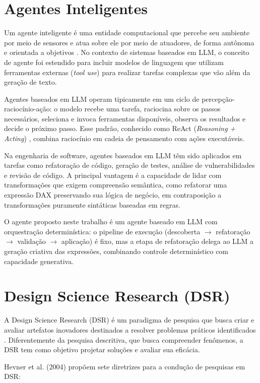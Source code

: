 \documentclass[
    12pt,               %
    openright,          %
    oneside,            %
    a4paper,            %
    chapter=TITLE,      %
    section=TITLE,      %
    brazil              %
]{abntex2}
\begin{document}
\section{Agentes Inteligentes}

Um agente inteligente é uma entidade computacional que percebe seu ambiente por meio de sensores e atua sobre ele por meio de atuadores, de forma autônoma e orientada a objetivos \cite{russell2021ai}. No contexto de sistemas baseados em LLM, o conceito de agente foi estendido para incluir modelos de linguagem que utilizam ferramentas externas (\textit{tool use}) para realizar tarefas complexas que vão além da geração de texto.

Agentes baseados em LLM operam tipicamente em um ciclo de percepção-raciocínio-ação: o modelo recebe uma tarefa, raciocina sobre os passos necessários, seleciona e invoca ferramentas disponíveis, observa os resultados e decide o próximo passo. Esse padrão, conhecido como ReAct (\textit{Reasoning + Acting}) \cite{yao2023react}, combina raciocínio em cadeia de pensamento com ações executáveis.

Na engenharia de software, agentes baseados em LLM têm sido aplicados em tarefas como refatoração de código, geração de testes, análise de vulnerabilidades e revisão de código. A principal vantagem é a capacidade de lidar com transformações que exigem compreensão semântica, como refatorar uma expressão DAX preservando sua lógica de negócio, em contraposição a transformações puramente sintáticas baseadas em regras.

O agente proposto neste trabalho é um agente baseado em LLM com orquestração determinística: o pipeline de execução (descoberta $\rightarrow$ refatoração $\rightarrow$ validação $\rightarrow$ aplicação) é fixo, mas a etapa de refatoração delega ao LLM a geração criativa das expressões, combinando controle determinístico com capacidade generativa.

\section{Design Science Research (DSR)}

A Design Science Research (DSR) é um paradigma de pesquisa que busca criar e avaliar artefatos inovadores destinados a resolver problemas práticos identificados \cite{hevner2004design}. Diferentemente da pesquisa descritiva, que busca compreender fenômenos, a DSR tem como objetivo projetar soluções e avaliar sua eficácia.

Hevner et al. (2004) propõem sete diretrizes para a condução de pesquisas em DSR:
\end{document}
